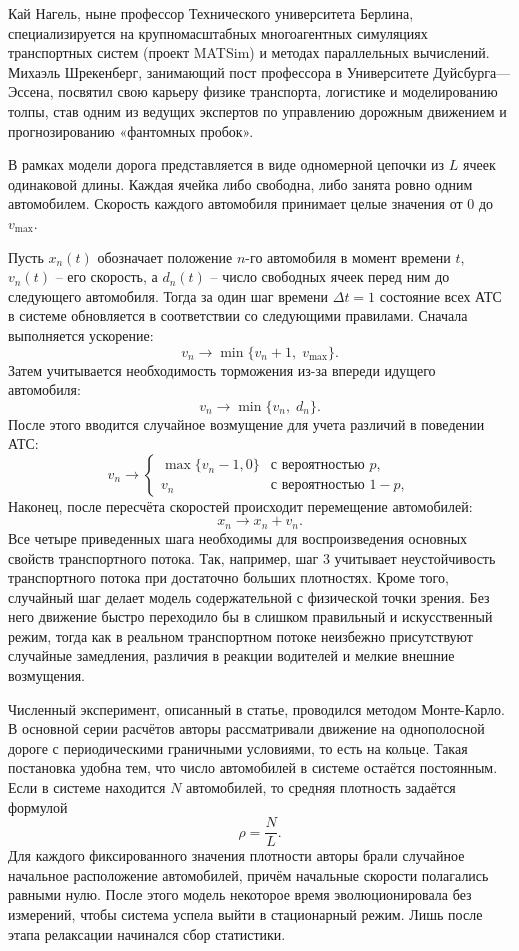 \documentclass[12pt,a4paper]{article}
\begin{document}
Кай Нагель, ныне профессор Технического университета Берлина, специализируется на крупномасштабных многоагентных симуляциях транспортных систем (проект MATSim) и методах параллельных вычислений. Михаэль Шрекенберг, занимающий пост профессора в Университете Дуйсбурга—Эссена, посвятил свою карьеру физике транспорта, логистике и моделированию толпы, став одним из ведущих экспертов по управлению дорожным движением и прогнозированию «фантомных пробок».

В рамках модели дорога представляется в виде одномерной цепочки из \(L\) ячеек одинаковой длины. Каждая ячейка либо свободна, либо занята ровно одним автомобилем. Скорость каждого автомобиля принимает целые значения от \(0\) до \(v_{\max}\).

Пусть \(x_n(t)\) обозначает положение \(n\)-го автомобиля в момент времени \(t\), \(v_n(t)\) -- его скорость, а \(d_n(t)\) -- число свободных ячеек перед ним до следующего автомобиля. Тогда за один шаг времени \(\Delta t = 1\) состояние всех АТС в системе обновляется в соответствии со следующими правилами. Сначала выполняется ускорение:
\[
v_n \rightarrow \min\{v_n+1,\;v_{\max}\}.
\]
Затем учитывается необходимость торможения из-за впереди идущего автомобиля:
\[
v_n \rightarrow \min\{v_n,\;d_n\}.
\]
После этого вводится случайное возмущение для учета различий в поведении АТС:
\[
v_n \rightarrow 
\begin{cases} 
\max\{v_n - 1, 0\} & \text{с вероятностью } p, \\
v_n & \text{с вероятностью } 1 - p,
\end{cases}
\]
Наконец, после пересчёта скоростей происходит перемещение автомобилей:
\[
x_n \rightarrow x_n+v_n.
\]
Все четыре приведенных шага необходимы для воспроизведения основных свойств транспортного потока. Так, например, шаг 3 учитывает неустойчивость транспортного потока при достаточно больших плотностях. Кроме того, случайный шаг делает модель содержательной с физической точки зрения. Без него движение быстро переходило бы в слишком правильный и искусственный режим, тогда как в реальном транспортном потоке неизбежно присутствуют случайные замедления, различия в реакции водителей и мелкие внешние возмущения.

Численный эксперимент, описанный в статье, проводился методом Монте-Карло. В основной серии расчётов авторы рассматривали движение на однополосной дороге с периодическими граничными условиями, то есть на кольце. Такая постановка удобна тем, что число автомобилей в системе остаётся постоянным. Если в системе находится \(N\) автомобилей, то средняя плотность задаётся формулой
\[
\rho=\frac{N}{L}.
\]
Для каждого фиксированного значения плотности авторы брали случайное начальное расположение автомобилей, причём начальные скорости полагались равными нулю. После этого модель некоторое время эволюционировала без измерений, чтобы система успела выйти в стационарный режим. Лишь после этапа релаксации начинался сбор статистики.
\end{document}
